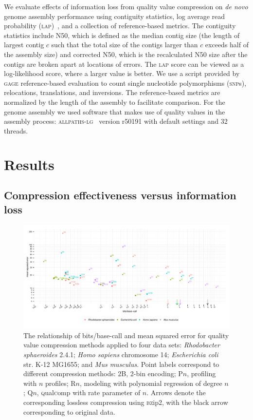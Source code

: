 \documentclass{bioinfo}
\begin{document}
\begin{methods}
We evaluate effects of information loss from quality value compression
on \emph{de novo} genome assembly performance using contiguity
statistics, log average read probability
(\textsc{lap})~\citep{Ghodsi:2013hb}, and a collection of
reference-based metrics. The contiguity statistics include N50, which
is defined as the median contig size (the length of largest contig $c$
such that the total size of the contigs larger than $c$ exceeds half
of the assembly size) and corrected N50, which is the recalculated N50
size after the contigs are broken apart at locations of errors. The
\textsc{lap} score can be viewed as a log-likelihood score, where a
larger value is better. We use a script provided by \textsc{gage}
reference-based evaluation to count single nucleotide polymorphisms
(\textsc{snp}s), relocations, translations, and inversions. The
reference-based metrics are normalized by the length of the assembly
to facilitate comparison. For the genome assembly we used software
that makes use of quality values in the assembly process:
\textsc{allpaths-lg}~\citep{Gnerre:2011kx} version r50191 with default
settings and 32 threads.

\end{methods}

\section{Results}

\subsection{Compression effectiveness versus information loss}

\begin{figure}[!tb]
\centerline{\includegraphics[width=7in]{compression_results.pdf}}
\caption{The relationship of bits/base-call and mean squared error for
  quality value compression methods applied to four data sets:
  \textit{Rhodobacter sphaeroides} 2.4.1; \textit{Homo sapiens}
  chromosome 14; \textit{Escherichia coli} str. K-12 MG1655; and
  \textit{Mus musculus}. Point labels correspond to different
  compression methods: 2B, 2-bin encoding; P$n$, profiling with $n$
  profiles; R$n$, modeling with polynomial regression of degree $n$;
  Q$n$, \textsc{q}ual\textsc{c}omp with rate parameter of $n$. Arrows
  denote the corresponding lossless compression using \textsc{bz}ip2,
  with the black arrow corresponding to original data.}
\label{fig:mse_vs_bpbp}
\end{figure}
\end{document}
